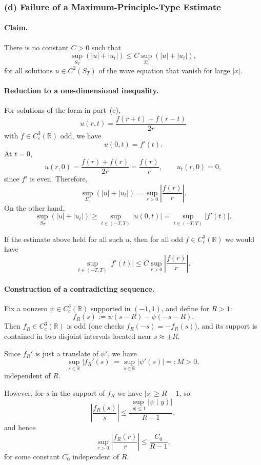 \documentclass[12pt,a4paper]{article}
\theoremstyle{plain}
\theoremstyle{definition}
\theoremstyle{remark}
\theoremstyle{remark}
\begin{document}
\subsubsection*{(d) \; Failure of a Maximum-Principle-Type Estimate}

\paragraph{\textbf{Claim.}}
There is no constant $C>0$ such that
\[
\sup_{S_T} (|u|+|u_t|)
\le C \sup_{\Sigma_0} (|u|+|u_t|),
\]
for all solutions $u\in C^2(S_T)$ of the wave equation that vanish for
large $|x|$.

\paragraph{\textbf{Reduction to a one-dimensional inequality.}}
For solutions of the form in part~(c),
\[
u(r,t) = \frac{f(r+t)+f(r-t)}{2r}
\]
with $f\in C_c^3(\mathbb{R})$ odd, we have
\[
u(0,t) = f'(t).
\]
At $t=0$,
\[
u(r,0) = \frac{f(r)+f(r)}{2r} = \frac{f(r)}{r},
\qquad
u_t(r,0) = 0,
\]
since $f'$ is even. Therefore,
\[
\sup_{\Sigma_0} (|u|+|u_t|)
= \sup_{r>0}\left|\frac{f(r)}{r}\right|.
\]
On the other hand,
\[
\sup_{S_T} (|u|+|u_t|)
\ge \sup_{t\in(-T,T)} |u(0,t)|
= \sup_{t\in(-T,T)} |f'(t)|.
\]

If the estimate above held for all such $u$, then for all odd
$f\in C_c^3(\mathbb{R})$ we would have
\[
\sup_{t\in(-T,T)} |f'(t)|
\le C \sup_{r>0}\left|\frac{f(r)}{r}\right|.
\tag{$\dagger$}
\]

\paragraph{\textbf{Construction of a contradicting sequence.}}
Fix a nonzero $\psi\in C_c^3(\mathbb{R})$ supported in $(-1,1)$, and
define for $R>1$:
\[
f_R(s) := \psi(s-R) - \psi(-s-R).
\]
Then $f_R\in C_c^3(\mathbb{R})$ is odd (one checks $f_R(-s)=-f_R(s)$),
and its support is contained in two disjoint intervals located near
$s\approx \pm R$.

Since $f_R'$ is just a translate of $\psi'$, we have
\[
\sup_{s\in\mathbb{R}} |f_R'(s)|
= \sup_{s\in\mathbb{R}} |\psi'(s)| =: M > 0,
\]
independent of $R$.

However, for $s$ in the support of $f_R$ we have $|s|\ge R-1$, so
\[
\left|\frac{f_R(s)}{s}\right|
\le \frac{\sup_{|y|\le 1}|\psi(y)|}{R-1},
\]
and hence
\[
\sup_{r>0}\left|\frac{f_R(r)}{r}\right|
\le \frac{C_0}{R-1},
\]
for some constant $C_0$ independent of $R$.
\end{document}
